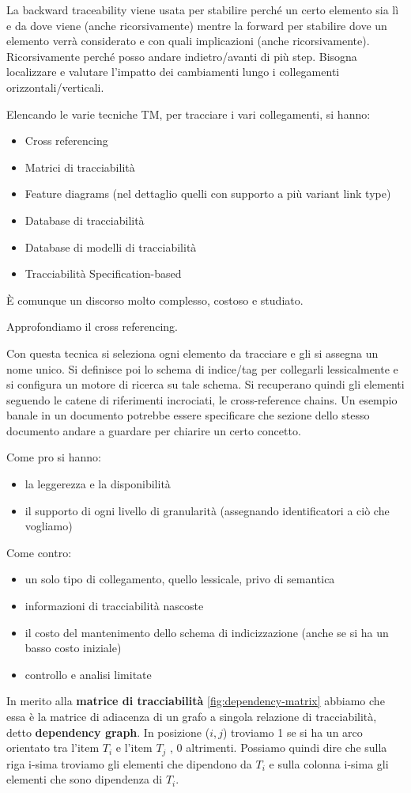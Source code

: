 La backward traceability viene usata per stabilire perché un certo elemento sia
lì e da dove viene (anche ricorsivamente) mentre la forward per stabilire dove un
elemento verrà considerato e con quali implicazioni (anche ricorsivamente).
Ricorsivamente perché posso andare indietro/avanti di più step. Bisogna localizzare
e valutare l'impatto dei cambiamenti lungo i collegamenti orizzontali/verticali.

Elencando le varie tecniche TM, per tracciare i vari collegamenti, si hanno:
\begin{itemize}
    \item Cross referencing
    \item Matrici di tracciabilità
    \item Feature diagrams (nel dettaglio quelli con supporto a più variant link
          type)
    \item Database di tracciabilità
    \item Database di modelli di tracciabilità
    \item Tracciabilità Specification-based
\end{itemize}
È comunque un discorso molto complesso, costoso e studiato.

Approfondiamo il cross referencing.

Con questa tecnica si seleziona ogni elemento da tracciare e gli si assegna un
nome unico. Si definisce poi lo schema di indice/tag per collegarli lessicalmente e
si configura un motore di ricerca su tale schema. Si recuperano quindi gli elementi
seguendo le catene di riferimenti incrociati, le cross-reference chains. Un esempio
banale in un documento potrebbe essere specificare che sezione dello stesso documento
andare a guardare per chiarire un certo concetto.

Come pro si hanno:
\begin{itemize}
    \item la leggerezza e la disponibilità
    \item il supporto di ogni livello di granularità (assegnando identificatori
          a ciò che vogliamo)
\end{itemize}
Come contro:
\begin{itemize}
    \item un solo tipo di collegamento, quello lessicale, privo di semantica
    \item informazioni di tracciabilità nascoste
    \item il costo del mantenimento dello schema di indicizzazione (anche se si ha
          un basso costo iniziale)
    \item controllo e analisi limitate
\end{itemize}
In merito alla \textbf{matrice di tracciabilità} \ref{fig:dependency-matrix} abbiamo che essa è la matrice
di adiacenza di un grafo a singola relazione di tracciabilità, detto \textbf{dependency graph}.
In posizione ($i,j$) troviamo 1 se si ha un arco orientato tra l'item $T_i$ e
l'item $T_j$ , 0 altrimenti. Possiamo quindi dire che sulla riga i-sima troviamo
gli elementi che dipendono da $T_i$ e sulla colonna i-sima gli elementi che sono
dipendenza di $T_i$.

